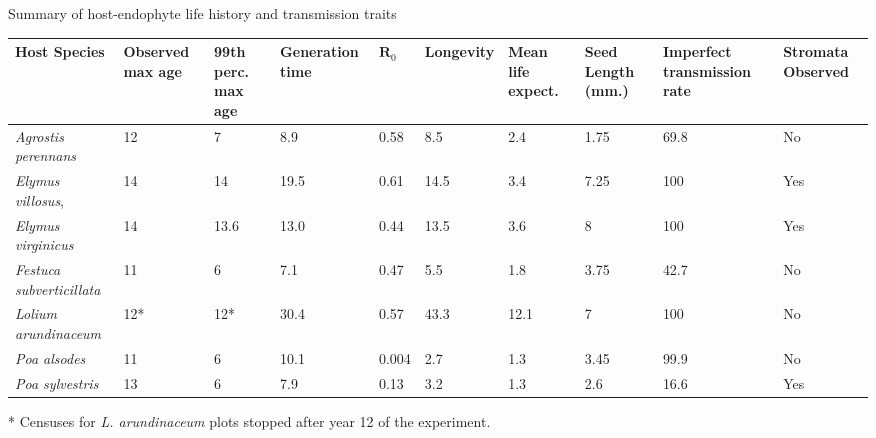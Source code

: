 \documentclass[12pt]{article}
\newcommand{\tom}[2]{{\color{red}{#1}}\footnote{\textit{\color{red}{#2}}}}
\begin{document}

\newpage


 Summary of host-endophyte life history and transmission traits\\
\begin{table}[ht]
\begin{adjustbox}{width=1\textwidth}{
\begin{tabular}{|p{4cm}| p{2cm} |p{2cm}|p{2cm}| p{1cm}|p{2cm}|p{2cm}|p{2cm}|p{2.5cm}| p{2cm}|}
	\hline
	\bf{Host Species} & \bf{Observed max age}& \bf{99th perc. max age}&\bf{Generation time} & $\textbf {R}_0$ &\bf{Longevity}&\bf{Mean life expect.}&\bf{Seed Length (mm.)}&\bf{Imperfect transmission rate} & \bf{Stromata Observed}\\
	\hline
	\emph{Agrostis perennans} &12&7&8.9&0.58&8.5&2.4&1.75&69.8&No\\
	\emph{Elymus villosus}, &14&14&19.5&0.61&14.5&3.4&7.25&100&Yes\\
	\emph{Elymus virginicus} &14&13.6&13.0&0.44&13.5&3.6&8&100&Yes\\
	\emph{Festuca subverticillata} &11&6&7.1&0.47&5.5&1.8&3.75&42.7&No\\
	\emph{Lolium arundinaceum} &12*&12*&30.4&0.57&43.3&12.1&7&100&No\\
	\emph{Poa alsodes} &11&6&10.1&0.004&2.7&1.3&3.45&99.9&No\\
	\emph{Poa sylvestris}&13&6&7.9&0.13&3.2&1.3&2.6&16.6&Yes\\
	 \hline
\end{tabular}}
\end{adjustbox}
\end{table}

* Censuses for \emph{L. arundinaceum} plots stopped after year 12 of the experiment.
\end{document}
